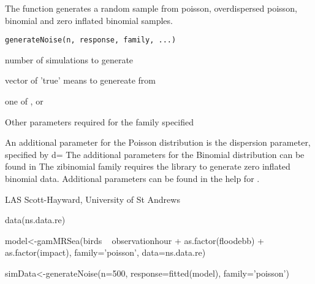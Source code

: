 \documentclass[a4paper]{book}
\begin{document}
%
\begin{Description}\relax
The function generates a random sample from poisson, overdispersed poisson, binomial and zero inflated binomial samples.
\end{Description}
%
\begin{Usage}
\begin{verbatim}
generateNoise(n, response, family, ...)
\end{verbatim}
\end{Usage}
%
\begin{Arguments}
\begin{ldescription}
\item[\code{n}] number of simulations to generate

\item[\code{response}] vector of 'true' means to genereate from

\item[\code{family}] one of ,  or 

\item[\code{...}] Other parameters required for the family specified
\end{ldescription}
\end{Arguments}
%
\begin{Details}\relax
An additional parameter for the Poisson distribution is the dispersion parameter, specified by d=
The additional parameters for the Binomial distribution can be found in 
The zibinomial family requires the  library to generate zero inflated binomial data. Additional parameters can be found in the help for .
\end{Details}
%
\begin{Author}\relax
LAS Scott-Hayward, University of St Andrews
\end{Author}
%
\begin{Examples}
\begin{ExampleCode}

data(ns.data.re)

model<-gamMRSea(birds ~ observationhour + as.factor(floodebb) + as.factor(impact),  
              family='poisson', data=ns.data.re)

simData<-generateNoise(n=500, response=fitted(model), family='poisson')

\end{ExampleCode}
\end{Examples}
\end{document}
